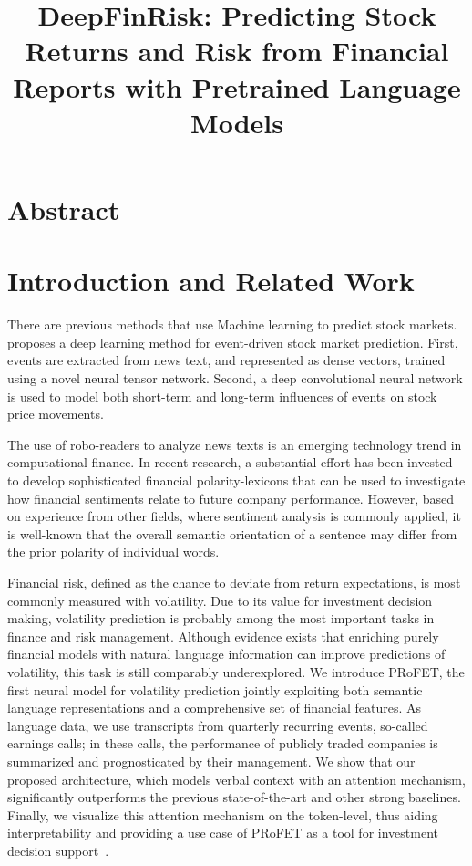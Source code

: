 \documentclass[11pt]{article}
\title{\vspace{-4cm} DeepFinRisk: Predicting Stock Returns and Risk
  from Financial Reports with Pretrained Language Models}
\author{}
\date{}
\begin{document}
\maketitle

\section{Abstract}

\section{Introduction and Related Work}

There are previous methods that use Machine learning to predict stock
markets.~\cite{ding2015} proposes a deep learning method for
event-driven stock market prediction. First, events are extracted from news text, and represented as dense vectors,
trained using a novel neural tensor network. Second, a deep convolutional neural network is used to model both short-term and
long-term influences of events on stock price movements.

The use of robo-readers to analyze news texts is an emerging technology trend in computational finance. In recent
research, a substantial effort has been invested to develop sophisticated financial polarity-lexicons that can be used to
investigate how financial sentiments relate to future company performance. However, based on experience from other
fields, where sentiment analysis is commonly applied, it is well-known
that the overall semantic orientation of a sentence may differ from the prior polarity of individual words.

Financial risk, defined as the chance to deviate from return expectations, is most commonly measured
with volatility. Due to its value for investment decision making, volatility prediction is probably
among the most important tasks in finance and risk management. Although evidence exists that enriching purely financial models with natural language
information can improve predictions of volatility, this task is still comparably underexplored. We introduce PRoFET, the
first neural model for volatility prediction jointly exploiting both
semantic language representations and a comprehensive set of financial
features. As language data, we use transcripts from quarterly
recurring events, so-called earnings calls; in these calls, the performance of publicly traded companies is summarized and prognosticated by their management. We show that our
proposed architecture, which models verbal context with an attention mechanism, significantly outperforms the previous state-of-the-art and other strong
baselines. Finally, we visualize this attention mechanism on the token-level, thus aiding interpretability and providing a use case of PRoFET as a tool
for investment decision support~\cite{theil2019}.
\end{document}
